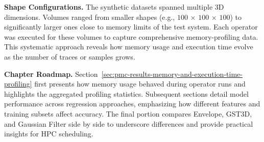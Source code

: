 \vspace{1em}
\noindent
\textbf{Shape Configurations.}
The synthetic datasets spanned multiple \ac{3D} dimensions.
Volumes ranged from smaller shapes (e.g., $100$ $\times$ $100$ $\times$ $100$) to significantly larger ones close to memory limits of the test system.
Each operator was executed for these volumes to capture comprehensive memory-profiling data.
This systematic approach reveals how memory usage and execution time evolve as the number of traces or samples grows.

\vspace{1em}
\noindent
\textbf{Chapter Roadmap.}
Section~\ref{sec:pmc-results-memory-and-execution-time-profiling} first presents how memory usage behaved during operator runs and highlights the aggregated profiling statistics.
Subsequent sections detail model performance across regression approaches, emphasizing how different features and training subsets affect accuracy.
The final portion compares Envelope, \ac{GST3D}, and Gaussian Filter side by side to underscore differences and provide practical insights for \ac{HPC} scheduling.


